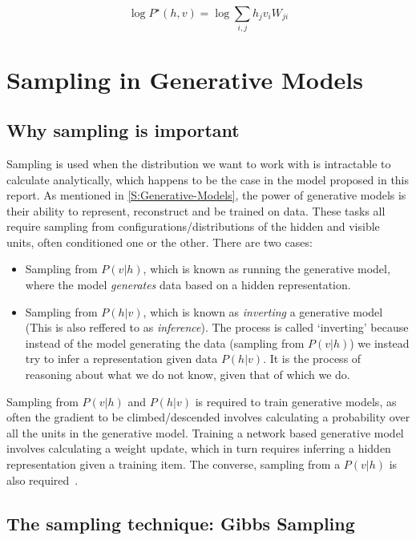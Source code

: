 \begin{equation}\label{eq:LogPJoint}
   \log P^\star(h, v) = \log \sum_{i,j} {h_j v_i W_{ji}}
\end{equation}

\section{Sampling in Generative Models}

\subsection{Why sampling is important}

Sampling is used when the distribution we want to work with is intractable to calculate analytically, which happens to be the case in the model proposed in this report. As mentioned in \ref{S:Generative-Models}, the power of generative models is their ability to represent, reconstruct and be trained on data. These tasks all require sampling from configurations/distributions of the hidden and visible units, often conditioned one or the other. There are two cases:
\begin{itemize}
  \item Sampling from $P(v|h)$, which is known as running the generative model, where the model \emph{generates} data based on a hidden representation.
  \item Sampling from $P(h|v)$, which is known as \emph{inverting} a generative model (This is also reffered to as \emph{inference}). The process is called `inverting' because instead of the model generating the data (sampling from $P(v|h)$) we instead try to infer a representation given data $P(h|v)$. It is the process of reasoning about what we do not know, given that of which we do.
\end{itemize}

Sampling from $P(v|h)$ and $P(h|v)$ is required to train generative models, as often the gradient to be climbed/descended involves calculating a probability over all the units in the generative model. Training a network based generative model involves calculating a weight update, which in turn requires inferring a hidden representation given a training item. The converse, sampling from a $P(v|h)$ is also required~\cite{dempster1977maximum}.

\subsection{The sampling technique: Gibbs Sampling}

